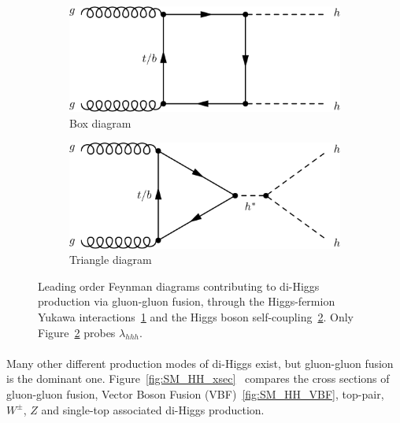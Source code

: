 \begin{figure}[htbp!]
\centering
\captionsetup{justification=centering}
    \begin{subfigure}[b]{0.4\textwidth}
        \includegraphics[width=\textwidth]{figures/theory/SM_HH_box}
        \caption{Box diagram}
        \label{fig:SM_HH_box}
    \end{subfigure}
    \quad
    \begin{subfigure}[b]{0.4\textwidth}
        \includegraphics[width=\textwidth]{figures/theory/SM_HH_tri}
        \caption{Triangle diagram}
        \label{fig:SM_HH_tri}
    \end{subfigure}
\caption{Leading order Feynman diagrams contributing to di-Higgs production via gluon-gluon fusion, through the Higgs-fermion Yukawa interactions~\ref{fig:SM_HH_box} and the Higgs boson self-coupling~\ref{fig:SM_HH_tri}. Only Figure~\ref{fig:SM_HH_tri} probes $\lambda_{hhh}$.}
\label{fig:SM_HH}
\end{figure}

\paragraph{}
Many other different production modes of di-Higgs exist, but gluon-gluon fusion is the dominant one. Figure~\ref{fig:SM_HH_xsec}~\cite{Frederix:2014hta} compares the cross sections of gluon-gluon fusion, Vector Boson Fusion (VBF)~\ref{fig:SM_HH_VBF}, top-pair, $W^{\pm}$, $Z$ and single-top associated di-Higgs production.

